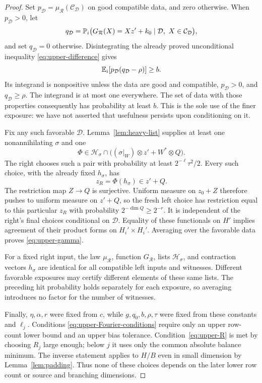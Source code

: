 \begin{proof}
Set $p_{\mathcal D}=\mu_{\mathcal R}(\mathcal C_{\mathcal D})$ on good
compatible data, and zero otherwise.  When $p_{\mathcal D}>0$, let
\[
 q_{\mathcal D}=
 \mathbb P_i\bigl(G_{\mathcal R}(X)=Xz'+k_0
                         \mid\mathcal D,\ X\in\mathcal C_{\mathcal D}\bigr),
\]
and set $q_{\mathcal D}=0$ otherwise.  Disintegrating the already proved
unconditional inequality \eqref{eq:upper-difference} gives
\begin{equation}\label{eq:upper-favorable-mass}
 \mathbb E_i[p_{\mathcal D}(q_{\mathcal D}-\rho)]\ge b.
\end{equation}
Its integrand is nonpositive unless the data are good and compatible,
$p_{\mathcal D}>0$, and $q_{\mathcal D}\ge\rho$.  The integrand is at
most one everywhere.  The set of data with those properties consequently
has probability at least $b$.  This is the sole use of the finer exposure:
we have not asserted that usefulness persists upon conditioning on it.

Fix any such favorable $\mathcal D$.  Lemma~\ref{lem:heavy-list} supplies
at least one nonannihilating $\sigma$ and one
\[
 \Phi\in\mathcal H_\sigma\cap
       \bigl((\sigma|_W)\otimes z'+W^*\otimes Q\bigr).
\]
The right chooses such a pair with probability at least
$2^{-\ell}\tau^2/2$.  Every such choice, with the already fixed
$h_\sigma$, has
\[
 z_R=\Phi(h_\sigma)\in z'+Q.
\]
The restriction map $Z\longrightarrow Q$ is surjective.  Uniform measure
on $z_0+Z$ therefore pushes to uniform measure on $z'+Q$, so the fresh
left choice has restriction equal to this particular $z_R$ with probability
$2^{-\dim Q}\ge2^{-r}$.  It is independent of the right's final choices
conditional on $\mathcal D$.  Equality of these functionals on $H'$
implies agreement of their product forms on $H_i'\times H_i'$.
Averaging over the favorable data proves \eqref{eq:upper-gamma}.

For a fixed right input, the law $\mu_{\mathcal R}$, function
$G_{\mathcal R}$, lists $\mathcal H_\sigma$, and contraction vectors
$h_\sigma$ are identical for all compatible left inputs and witnesses.
Different favorable exposures may certify different elements of these same
lists.  The preceding hit probability holds separately for each exposure,
so averaging introduces no factor for the number of witnesses.

Finally, $\eta,\alpha,r$ were fixed from $c$, while $g,q_0,b,\rho,\tau$
were fixed from these constants and $\ell_j$.  Conditions
\eqref{eq:upper-Fourier-conditions} require only an upper row-count
lower bound and an upper bias tolerance.  Condition~\eqref{eq:upper-R}
is met by choosing $R_j$ large enough; below $j$ it uses only the common
absolute balance minimum.  The inverse statement applies to $H/B$ even
in small dimension by Lemma~\ref{lem:padding}.  Thus none of these choices
depends on the later lower row count or source and branching dimensions.
\end{proof}


